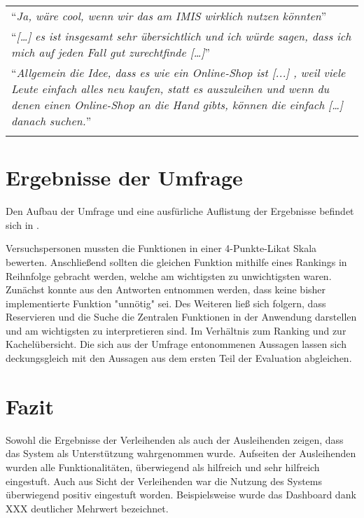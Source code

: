 \begin{longtable}{p{}} \arrayrulecolor{maincolor}\hline
  \enquote{\textit{Ja, wäre cool, wenn wir das am IMIS wirklich nutzen
  könnten}}                                                      \\
  \enquote{\textit{[\dots] es ist insgesamt sehr übersichtlich und ich würde
  sagen, dass ich mich auf jeden Fall gut zurechtfinde [\dots]}} \\
  \enquote{\textit{Allgemein die Idee, dass es wie ein Online-Shop ist [...] ,
      weil viele Leute einfach alles neu kaufen, statt es auszuleihen und wenn du
      denen einen Online-Shop an die Hand gibts, können die einfach [\dots] danach
  suchen.}}                                                      \\
  \arrayrulecolor{maincolor}\hline
\end{longtable}


\section{Ergebnisse der Umfrage}
Den Aufbau der Umfrage und eine ausfürliche Auflistung der Ergebnisse befindet sich in . 

Versuchspersonen mussten die Funktionen in einer 4-Punkte-Likat Skala bewerten. Anschließend sollten
die gleichen Funktion mithilfe eines Rankings in Reihnfolge gebracht werden, welche am wichtigsten
zu unwichtigsten waren. Zunächst konnte aus den Antworten entnommen werden, dass keine bisher
implementierte Funktion "unnötig" sei. Des Weiteren ließ sich folgern, dass Reservieren und die
Suche die Zentralen Funktionen in der Anwendung darstellen und am wichtigsten zu interpretieren
sind. Im Verhältnis zum Ranking und zur Kachelübersicht. Die sich aus der Umfrage entonommenen
Aussagen lassen sich deckungsgleich mit den Aussagen aus dem ersten Teil der Evaluation abgleichen.

\section{Fazit}
Sowohl die Ergebnisse der Verleihenden als auch der Ausleihenden zeigen, dass das System als
Unterstützung wahrgenommen wurde. Aufseiten der Ausleihenden wurden alle Funktionalitäten,
überwiegend als hilfreich und sehr hilfreich eingestuft. Auch aus Sicht der Verleihenden
war die Nutzung des Systems überwiegend positiv eingestuft worden. Beispielsweise
wurde das Dashboard dank XXX deutlicher Mehrwert bezeichnet.

